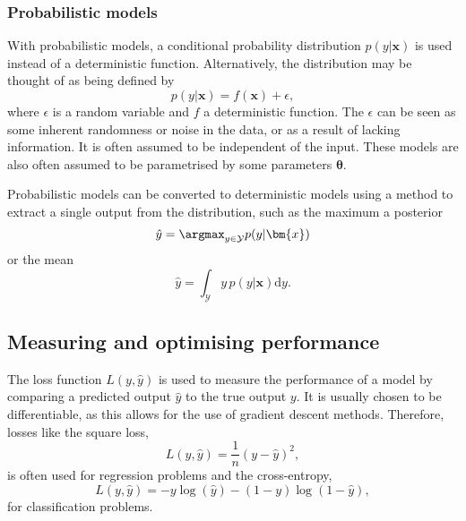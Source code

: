 \subsubsection{Probabilistic models}
With probabilistic models, a conditional probability distribution $p(y|\bm{x})$ is used instead of a deterministic function.
Alternatively, the distribution may be thought of as being defined by
\begin{equation}
    p(y|\bm{x}) = f(\bm{x}) + \epsilon,
    \label{eq:probabilistic_model}
\end{equation}
where $\epsilon$ is a random variable and $f$ a deterministic function.
The $\epsilon$ can be seen as some inherent randomness or noise in the data, or as a result of lacking information.
It is often assumed to be independent of the input.
These models are also often assumed to be parametrised by some parameters $\bm{\theta}$.

Probabilistic models can be converted to deterministic models using a method to extract a single output from the distribution, such as the maximum a posterior
\begin{equation}
    \hat{y} = \argmax_{y\in\mathcal{Y}} p(y|\bm{x})
\end{equation}
or the mean
\begin{equation}
    \hat{y} = \int_{\mathcal{Y}} y \, p(y|\bm{x})\mathrm{d}y.
\end{equation}


\subsection{Measuring and optimising performance}
The loss function $L(y, \hat{y})$ is used to measure the performance of a model by comparing a predicted output $\hat{y}$ to the true output $y$.
It is usually chosen to be differentiable, as this allows for the use of gradient descent methods.
Therefore, losses like the square loss,
\begin{equation}
    L(y, \hat{y}) = \frac{1}{n} (y - \hat{y})^2,
\end{equation}
is often used for regression problems and the cross-entropy,
\begin{equation}
    L(y, \hat{y}) = -y\log(\hat{y}) - (1-y)\log(1-\hat{y}),
\end{equation}
for classification problems.

